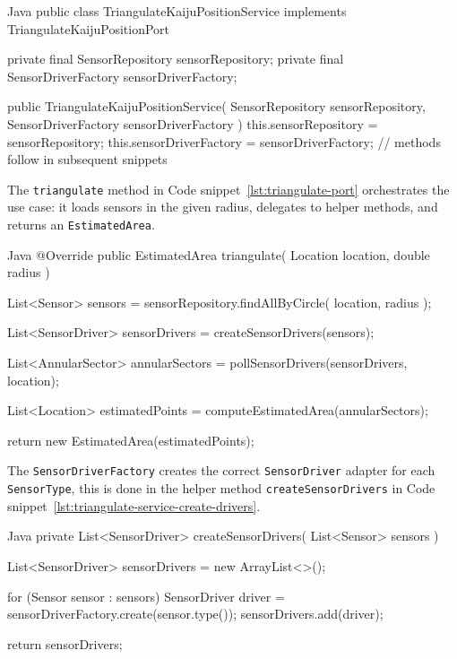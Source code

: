 \begin{ridercode}{Java}
public class TriangulateKaijuPositionService implements TriangulateKaijuPositionPort
{
    private final SensorRepository sensorRepository;
    private final SensorDriverFactory sensorDriverFactory;

    public TriangulateKaijuPositionService(
        SensorRepository sensorRepository,
        SensorDriverFactory sensorDriverFactory
    )
    {
        this.sensorRepository = sensorRepository;
        this.sensorDriverFactory = sensorDriverFactory;
    }
    // methods follow in subsequent snippets
}
\end{ridercode}
\label{lst:triangulate-service-class}

The \texttt{triangulate} method in Code snippet~\ref{lst:triangulate-port} orchestrates the use case: it loads sensors in the given radius, delegates to helper methods, and returns an \texttt{EstimatedArea}.

\begin{ridercode}{Java}
@Override
public EstimatedArea triangulate(
    Location location,
    double radius
)
{
    List<Sensor> sensors =
        sensorRepository.findAllByCircle(
            location,
            radius
        );

    List<SensorDriver> sensorDrivers =
        createSensorDrivers(sensors);

    List<AnnularSector> annularSectors =
        pollSensorDrivers(sensorDrivers, location);

    List<Location> estimatedPoints =
        computeEstimatedArea(annularSectors);

    return new EstimatedArea(estimatedPoints);
}
\end{ridercode}
\label{lst:triangulate-service-triangulate}

The \texttt{SensorDriverFactory} creates the correct \texttt{SensorDriver} adapter for each \texttt{SensorType}, this is done in the helper method \texttt{createSensorDrivers} in Code snippet~\ref{lst:triangulate-service-create-drivers}.

\begin{ridercode}{Java}
private List<SensorDriver> createSensorDrivers(
    List<Sensor> sensors
)
{
    List<SensorDriver> sensorDrivers = new ArrayList<>();

    for (Sensor sensor : sensors)
    {
        SensorDriver driver =
            sensorDriverFactory.create(sensor.type());
        sensorDrivers.add(driver);
    }

    return sensorDrivers;
}
\end{ridercode}
\label{lst:triangulate-service-create-drivers}

